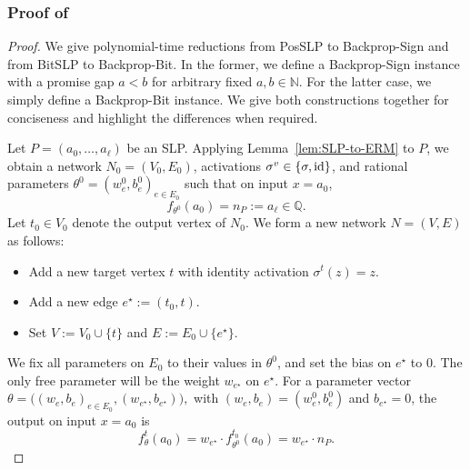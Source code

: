 \documentclass{article}
\theoremstyle{plain}
\theoremstyle{definition}
\theoremstyle{remark}
\begin{document}
\subsubsection*{Proof of }
\begin{proof}
	We give polynomial-time reductions from \textnormal{PosSLP} to
	\textnormal{Backprop-Sign} and from \textnormal{BitSLP} to
	\textnormal{Backprop-Bit}. In the former, we define a \textnormal{Backprop-Sign} instance with a promise gap $a<b$ for arbitrary fixed $a,b \in \mathbb{N}$. For the latter case, we simply define a \textnormal{Backprop-Bit} instance. We give both constructions together for conciseness and highlight the differences when required. 
	
	Let $P=(a_0,\dots,a_\ell)$ be an SLP. Applying
	Lemma~\ref{lem:SLP-to-ERM} to $P$, we obtain a network
	$N_0=(V_0,E_0)$, activations $\sigma^v\in\{\sigma,\textnormal{id}\}$, and rational
	parameters $\theta^0=(w_e^0,b_e^0)_{e\in E_0}$ such that on input
	$x=a_0$,
	\[
	f_{\theta^0}(a_0) = n_P := a_\ell\in\mathbb{Q}.
	\]
	Let $t_0\in V_0$ denote the output vertex of $N_0$.
%	
	We form a new network $N=(V,E)$ as follows:
	\begin{itemize}
		\item Add a new target vertex $t$ with identity activation $\sigma^t(z)=z$.
		\item Add a new edge $e^\star := (t_0,t)$.
		\item Set $V := V_0 \cup \{t\}$ and $E := E_0 \cup \{e^\star\}$.
	\end{itemize}
	We fix all parameters on $E_0$ to their values in $\theta^0$, and set
	the bias on $e^\star$ to $0$. The only free parameter will be the weight
	$w_{e^\star}$ on $e^\star$.
	For a parameter vector
	$
	\theta = \bigl((w_e,b_e)_{e\in E_0}, (w_{e^\star},b_{e^\star})\bigr),
	$
	with $(w_e,b_e)=(w_e^0,b_e^0)$ and $b_{e^\star}=0$, the output on input
	$x=a_0$ is
	\[
	f^t_\theta(a_0)
	= w_{e^\star} \cdot f^{t_0}_{\theta^0}(a_0)
	= w_{e^\star} \cdot n_P.
	\]
	


\end{proof}
\end{document}
